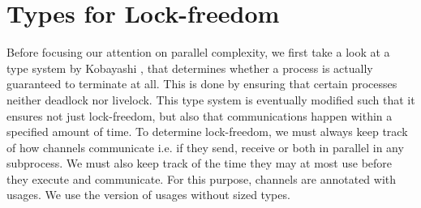 \section{Types for Lock-freedom}\label{sec:lockfreedomts}


Before focusing our attention on parallel complexity, we first take a look at a type system by Kobayashi \cite{Kobayashi2000}, that determines whether a process is actually guaranteed to terminate at all. This is done by ensuring that certain processes neither deadlock nor livelock. This type system is eventually modified such that it ensures not just lock-freedom, but also that communications happen within a specified amount of time. To determine lock-freedom, we must always keep track of how channels communicate i.e. if they send, receive or both in parallel in any subprocess. We must also keep track of the time they may at most use before they execute and communicate. For this purpose, channels are annotated with usages. We use the version of usages without sized types.\\

